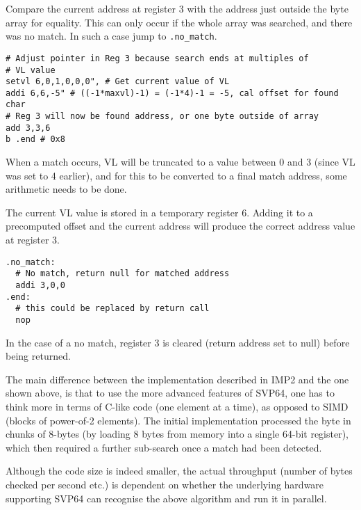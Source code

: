 Compare the current address at register 3 with the address just outside
the byte array for equality. This can only occur if the whole array was
searched, and there was no match. In such a case jump to \texttt{.no\_match}.

\begin{verbatim}
# Adjust pointer in Reg 3 because search ends at multiples of
# VL value
setvl 6,0,1,0,0,0", # Get current value of VL
addi 6,6,-5" # ((-1*maxvl)-1) = (-1*4)-1 = -5, cal offset for found char
# Reg 3 will now be found address, or one byte outside of array
add 3,3,6
b .end # 0x8
\end{verbatim}

When a match occurs, VL will be truncated to a value between 0 and 3 (since VL
was set to 4 earlier), and for this to be converted to a final match address,
some arithmetic needs to be done.

The current VL value is stored in a temporary register 6. Adding it to a
precomputed offset and the current address will produce the correct address
value at register 3.

\begin{verbatim}
.no_match:
  # No match, return null for matched address
  addi 3,0,0
.end:
  # this could be replaced by return call
  nop
\end{verbatim}

In the case of a no match, register 3 is cleared (return address set to null)
before being returned.

The main difference between the implementation described in IMP2 and the one
shown above, is that to use the more advanced features of SVP64, one has to
think more in terms of C-like code (one element at a time),
as opposed to SIMD (blocks of power-of-2 elements). The initial
implementation processed the byte in chunks of 8-bytes (by loading 8 bytes
from memory into a single 64-bit register), which then required a further
sub-search once a match had been detected.

Although the code size is indeed smaller, the actual throughput (number of
bytes checked per second etc.) is dependent on whether the underlying hardware
supporting SVP64 can recognise the above algorithm and run it in parallel.
